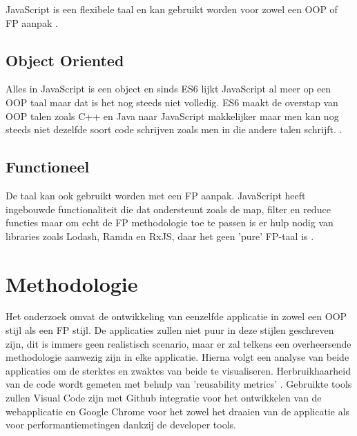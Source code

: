 

JavaScript is een flexibele taal en kan gebruikt worden voor zowel een OOP of FP aanpak \autocite{Flanagan2011}. 

\subsection*{Object Oriented}
Alles in JavaScript is een object en sinds ES6 lijkt JavaScript al meer op een OOP taal maar dat is het nog steeds niet volledig. ES6 maakt de overstap van OOP talen zoals C++ en Java naar JavaScript makkelijker maar men kan nog steeds niet dezelfde soort code schrijven zoals men in die andere talen schrijft.
\autocite{Khan}. 

\subsection*{Functioneel}
De taal kan ook gebruikt worden met een FP aanpak. JavaScript heeft ingebouwde functionaliteit die dat ondersteunt zoals de map, filter en reduce functies maar om echt de FP methodologie toe te passen is er hulp nodig van libraries zoals Lodash, Ramda en RxJS, daar het geen 'pure' FP-taal is \autocite{Atencio2016}.


\section{Methodologie}
\label{sec:methodologie}

Het onderzoek omvat de ontwikkeling van eenzelfde applicatie in zowel een OOP stijl als een FP stijl. De applicaties zullen niet puur in deze stijlen geschreven zijn, dit is immers geen realistisch scenario, maar er zal telkens een overheersende methodologie aanwezig zijn in elke applicatie. Hierna volgt een analyse van beide applicaties om de sterktes en zwaktes van beide te visualiseren. Herbruikhaarheid van de code wordt gemeten met behulp van 'reusability metrics' \autocite{Poulin1996}. Gebruikte tools zullen Visual Code zijn met Github integratie voor het ontwikkelen van de webapplicatie en Google Chrome voor het zowel het draaien van de applicatie als voor performantiemetingen dankzij de developer tools.


